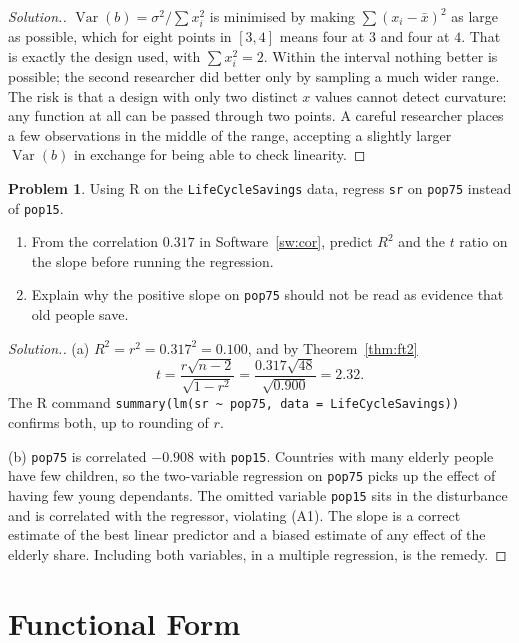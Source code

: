 \documentclass[11pt,a4paper]{article}
\numberwithin{equation}{section}
\DeclareMathOperator{\Var}{Var}
\theoremstyle{definition}
\newtheorem{problemx}{Problem}[subsection]
\newenvironment{problem}{\begin{problemx}}{\end{problemx}}
\newenvironment{solution}
  {\renewcommand{\qedsymbol}{}\begin{proof}[\textit{Solution}.]}
  {\end{proof}}
\begin{document}
\begin{solution}
$\Var(b) = \sigma^2/\sum x_i^2$ is minimised by making $\sum (x_i - \bar x)^2$ as large as possible, which for eight points in $[3, 4]$ means four at $3$
and four at $4$. That is exactly the design used, with $\sum x_i^2 = 2$. Within the interval nothing better is possible; the second researcher
did better only by sampling a much wider range. The risk is that a design with only two distinct $x$ values cannot detect curvature: any
function at all can be passed through two points. A careful researcher places a few observations in the middle of the range, accepting a slightly
larger $\Var(b)$ in exchange for being able to check linearity.
\end{solution}

\begin{problem}
Using R on the \texttt{LifeCycleSavings} data, regress \texttt{sr} on \texttt{pop75} instead of \texttt{pop15}.
\begin{enumerate}[label=(\alph*)]
\item From the correlation $0.317$ in Software~\ref{sw:cor}, predict $R^2$ and the $t$ ratio on the slope before running the regression.
\item Explain why the positive slope on \texttt{pop75} should not be read as evidence that old people save.
\end{enumerate}
\end{problem}

\begin{solution}
(a) $R^2 = r^2 = 0.317^2 = 0.100$, and by Theorem~\ref{thm:ft2}
\[
t = \frac{r\sqrt{n-2}}{\sqrt{1 - r^2}} = \frac{0.317\sqrt{48}}{\sqrt{0.900}} = 2.32 .
\]
The R command \texttt{summary(lm(sr \textasciitilde{} pop75, data = LifeCycleSavings))} confirms both, up to rounding of $r$.

(b) \texttt{pop75} is correlated $-0.908$ with \texttt{pop15}. Countries with many elderly people have few children, so the two-variable
regression on \texttt{pop75} picks up the effect of having few young dependants. The omitted variable \texttt{pop15} sits in the disturbance and is
correlated with the regressor, violating (A1). The slope is a correct estimate of the best linear predictor and a biased estimate of any effect of
the elderly share. Including both variables, in a multiple regression, is the remedy.
\end{solution}

\section{Functional Form}
\label{sec:form}
\end{document}
